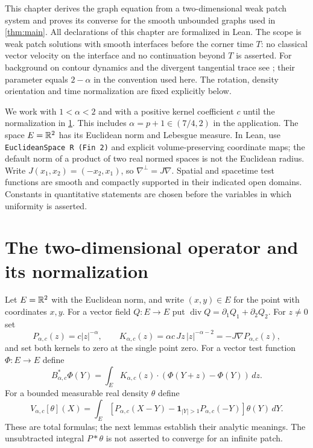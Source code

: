\label{sec:c13_patch_equation}

This chapter derives the graph equation from a two-dimensional weak patch system and proves
its converse for the smooth unbounded graphs used in \cref{thm:main}.
All declarations of this chapter are formalized in Lean.
The scope is weak patch solutions with smooth interfaces before the corner time $T$: no classical
vector velocity on the interface and no continuation beyond $T$ is asserted.
For background on contour dynamics and the divergent tangential trace see
\cite[Section~3.1]{Hunter-Shu:regularized-approximate-model-sqg}; their parameter equals $2-\alpha$
in the convention used here. The rotation, density orientation and time normalization are fixed explicitly below.

We work with $1<\alpha<2$ and with a positive kernel coefficient $c$ until the normalization in
\cref{sec:c13_operator}. This includes $\alpha=p+1\in(7/4,2)$ in the application.
The space $E=\mathbb{R}^2$ has its Euclidean norm and Lebesgue measure. In Lean, use
\texttt{EuclideanSpace R (Fin 2)} and explicit volume-preserving coordinate maps;
the default norm of a product of two real normed spaces is not the Euclidean radius.
Write $J(x_1,x_2)=(-x_2,x_1)$, so $\nabla^\perp=J\nabla$.
Spatial and spacetime test functions are smooth and compactly supported in their indicated open domains.
Constants in quantitative statements are chosen before the variables in which uniformity is asserted.

\section{The two-dimensional operator and its normalization}
\label{sec:c13_operator}

\begin{definition}
  \label{def:c13_kernel_data}
  Let $E=\mathbb{R}^2$ with the Euclidean norm, and write $(x,y)\in E$ for the point with coordinates $x,y$.
  For a vector field $Q:E\to E$ put $\operatorname{div}Q=\partial_1Q_1+\partial_2Q_2$.
  For $z\ne0$ set
  \[
    P_{\alpha,c}(z)=c|z|^{-\alpha},\qquad
    K_{\alpha,c}(z)=\alpha c\,Jz\,|z|^{-\alpha-2}=-J\nabla P_{\alpha,c}(z),
  \]
  and set both kernels to zero at the single point zero.
  For a vector test function $\Phi:E\to E$ define
  \[
    B^*_{\alpha,c}\Phi(Y)=\int_E K_{\alpha,c}(z)\cdot(\Phi(Y+z)-\Phi(Y))\,dz.
  \]
  For a bounded measurable real density $\theta$ define
  \[
    V_{\alpha,c}[\theta](X)=\int_E
       [P_{\alpha,c}(X-Y)-\mathbf1_{|Y|>1}P_{\alpha,c}(-Y)]\theta(Y)\,dY.
  \]
  These are total formulas; the next lemmas establish their analytic meanings.
  The unsubtracted integral $P*\theta$ is not asserted to converge for an infinite patch.
\end{definition}

